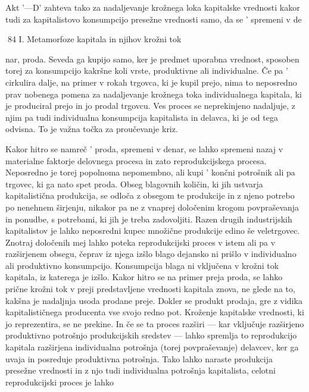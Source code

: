 \documentclass[kapital_02.tex]{subfiles}
\begin{document}
Akt \KPEB'—D' zahteva tako za nadaljevanje krožnega loka kapitalske vrednosti kakor tudi za kapitalistovo konsumpcijo presežne vrednosti samo, da se \KPEB' spremeni v de

 84 I. Metamorfoze kapitala in njihov krožni tok



 nar, proda. Seveda ga kupijo samo, ker je predmet uporabna vrednost, sposoben torej za konsumpcijo kakršne koli vrste, produktivne ali individualne. Če pa \KPEB' cirkulira dalje, na primer v rokah trgovca, ki je kupil prejo, nima to neposredno prav nobenega pomena za nadaljevanje krožnega toka individualnega kapitala, ki je produciral prejo in jo prodal trgovcu. Ves proces se neprekinjeno nadaljuje, z njim pa tudi individualna konsumpcija kapitalista in delavca, ki je od tega odvisna. To je važna točka za proučevanje kriz.

Kakor hitro se namreč \KPEB' proda, spremeni v denar, se lahko spremeni nazaj v materialne faktorje delovnega procesa in zato reprodukcijskega procesa. Neposredno je torej popolnoma nepomembno, ali kupi \KPEB' končni potrošnik ali pa trgovec, ki ga nato spet proda. Obseg blagovnih količin, ki jih ustvarja kapitalistična produkcija, se odloča z obsegom te produkcije in z njeno potrebo po nenehnem širjenju, nikakor pa ne z vnaprej določenim krogom povpraševanja in ponudbe, s potrebami, ki jih je treba zadovoljiti. Razen drugih industrijskih kapitalistov je lahko neposredni kupec množične produkcije edino še veletrgovec. Znotraj določenih mej lahko poteka reprodukcijski proces v istem ali pa v razširjenem obsegu, čeprav iz njega izšlo blago dejansko ni prišlo v individualno ali produktivno konsumpcijo. Konsumpcija blaga ni vključena v krožni tok kapitala, iz katerega je izšlo. Kakor hitro se na primer preja proda, se lahko prične krožni tok v preji predstavljene vrednosti kapitala znova, ne glede na to, kakšna je nadaljnja usoda prodane preje. Dokler se produkt prodaja, gre z vidika kapitalističnega producenta vse svojo redno pot. Kroženje kapitalske vrednosti, ki jo reprezentira, se ne prekine. In če se ta proces razširi — kar vključuje razširjeno produktivno potrošnjo produkcijskih sredstev — lahko spremlja to reprodukcijo kapitala razširjena individualna potrošnja (torej povpraševanje) delavcev, ker ga uvaja in posreduje produktivna potrošnja. Tako lahko naraste produkcija presežne vrednosti in z njo tudi individualna potrošnja kapitalista, celotni reprodukcijski proces je lahko
\end{document}
